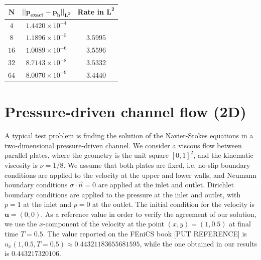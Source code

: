 \documentclass[11pt,a4paper,titlepage]{report}
\begin{document}
\begin{center}
\begin{tabular}{| c | c | c |}
\hline
$\mathbf{N}$ & $\mathbf{|| p_{exact} - p_h ||_{L^2}}$ & \textbf{Rate in } $  \mathbf{L^2}$  \\
\hline
$ 4 $ & $1.4420  \times 10^{-4} $ & \\
\hline
$ 8 $ & $ 1.1896  \times 10^{-5} $ & $3.5995$ \\
\hline
$ 16 $ & $ 1.0089  \times 10^{-6} $ & $3.5596$ \\
\hline
$ 32 $ & $  8.7143 \times 10^{-8} $ & $3.5332$ \\
\hline
$ 64 $ & $ 8.0070 \times 10^{-9} $ & $3.4440$ \\
\hline
\end{tabular}
\end{center}




\section{Pressure-driven channel flow (2D)}


A typical test problem is finding the solution of the Navier-Stokes equations in a two-dimensional pressure-driven channel. We consider a viscous flow between parallel plates, where the geometry is the unit square $[0,1]^2$, and the kinematic viscosity is $\nu = 1/8$. We assume that both plates are fixed, i.e. no-slip boundary conditions are applied to the velocity at the upper and lower walls, and Neumann boundary conditions $\sigma \cdot \vec{n} = 0$ are applied at the inlet and outlet. Dirichlet boundary conditions are applied to the pressure at the inlet and outlet, with $p = 1$ at the inlet and $p = 0$ at the outlet. The initial condition for the velocity is $\mathbf{u} = (0,0)$. As a reference value in order to verify the agreement of our solution, we use the $x$-component of the velocity at the point $(x, y) = (1, 0.5)$ at final time $T = 0.5 $. The value reported on the FEniCS book [PUT REFERENCE] is $u_x(1, 0.5, T=0.5) \approx 0.44321183655681595$, while the one obtained in our results is $0.443217320106$.
\end{document}
